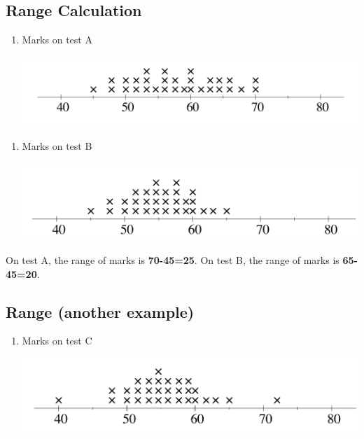 \documentclass[]{article}
\providecommand{\tightlist}{%
  \setlength{\itemsep}{0pt}\setlength{\parskip}{0pt}}
\begin{document}
\hypertarget{range-calculation}{%
\subsection{Range Calculation}\label{range-calculation}}

\begin{enumerate}
\def\labelenumi{\arabic{enumi}.}
\tightlist
\item
  Marks on test A

  \includegraphics[width=0.8\linewidth]{figure/testA-range}
\end{enumerate}

\begin{enumerate}
\def\labelenumi{\arabic{enumi}.}
\setcounter{enumi}{1}
\tightlist
\item
  Marks on test B

  \includegraphics[width=0.8\linewidth]{figure/testB-range}
\end{enumerate}

On test A, the range of marks is \textbf{70-45=25}. On test B, the range
of marks is \textbf{65-45=20}.

\hypertarget{range-another-example}{%
\subsection{Range (another example)}\label{range-another-example}}

\begin{enumerate}
\def\labelenumi{\arabic{enumi}.}
\setcounter{enumi}{2}
\tightlist
\item
  Marks on test C

  \includegraphics[width=0.8\linewidth]{figure/testC-range}
\end{enumerate}
\end{document}
